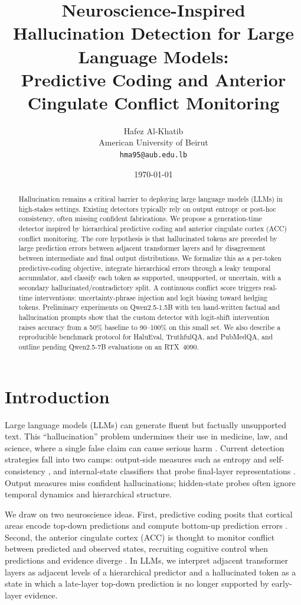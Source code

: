 \documentclass[letterpaper]{article}
\title{Neuroscience-Inspired Hallucination Detection for Large Language Models:\\
       Predictive Coding and Anterior Cingulate Conflict Monitoring}
\author{
  Hafez Al-Khatib \\
  American University of Beirut \\
  \texttt{hma95@aub.edu.lb}
}
\date{\today}
\begin{document}
\maketitle

\begin{abstract}
Hallucination remains a critical barrier to deploying large language models (LLMs) in high-stakes settings. Existing detectors typically rely on output entropy or post-hoc consistency, often missing confident fabrications. We propose a generation-time detector inspired by hierarchical predictive coding and anterior cingulate cortex (ACC) conflict monitoring. The core hypothesis is that hallucinated tokens are preceded by large prediction errors between adjacent transformer layers and by disagreement between intermediate and final output distributions. We formalize this as a per-token predictive-coding objective, integrate hierarchical errors through a leaky temporal accumulator, and classify each token as supported, unsupported, or uncertain, with a secondary hallucinated/contradictory split. A continuous conflict score triggers real-time interventions: uncertainty-phrase injection and logit biasing toward hedging tokens. Preliminary experiments on Qwen2.5-1.5B with ten hand-written factual and hallucination prompts show that the custom detector with logit-shift intervention raises accuracy from a 50\% baseline to 90--100\% on this small set. We also describe a reproducible benchmark protocol for HaluEval, TruthfulQA, and PubMedQA, and outline pending Qwen2.5-7B evaluations on an RTX~4090.
\end{abstract}

\section{Introduction}

Large language models (LLMs) can generate fluent but factually unsupported text. This ``hallucination'' problem undermines their use in medicine, law, and science, where a single false claim can cause serious harm \cite{ji2023survey}. Current detection strategies fall into two camps: output-side measures such as entropy and self-consistency \cite{kuhn2023semantic, miao2023selfcheckgpt}, and internal-state classifiers that probe final-layer representations \cite{azaria2023saplma}. Output measures miss confident hallucinations; hidden-state probes often ignore temporal dynamics and hierarchical structure.

We draw on two neuroscience ideas. First, predictive coding posits that cortical areas encode top-down predictions and compute bottom-up prediction errors \cite{rao1999predictive, friston2010free}. Second, the anterior cingulate cortex (ACC) is thought to monitor conflict between predicted and observed states, recruiting cognitive control when predictions and evidence diverge \cite{botvinick2001conflict, yeung2004neural}. In LLMs, we interpret adjacent transformer layers as adjacent levels of a hierarchical predictor and a hallucinated token as a state in which a late-layer top-down prediction is no longer supported by early-layer evidence.
\end{document}

